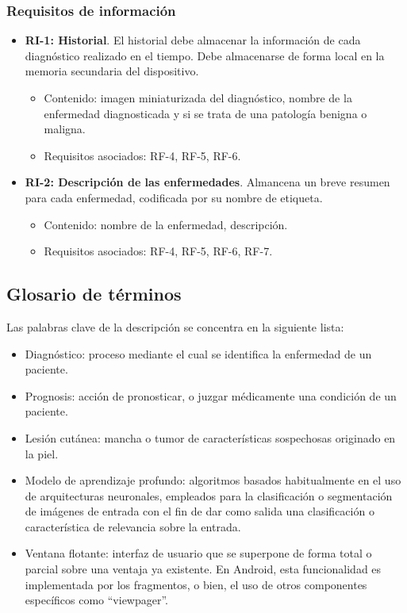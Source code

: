 \subsubsection{Requisitos de información}

\begin{itemize}
	 \item \textbf{RI-1: Historial}. El historial debe almacenar la información de cada diagnóstico realizado en el tiempo. Debe almacenarse de forma local en la memoria secundaria del dispositivo.
	 \begin{itemize}
	 	\item Contenido: imagen miniaturizada del diagnóstico, nombre de la enfermedad diagnosticada y si se trata de una patología benigna o maligna. 
	 	\item Requisitos asociados: RF-4, RF-5, RF-6.
	 \end{itemize}
	\item  \textbf{RI-2: Descripción de las enfermedades}. Almancena un breve resumen para cada enfermedad, codificada por su nombre de etiqueta.
		 \begin{itemize}
		\item Contenido: nombre de la enfermedad, descripción.
		\item Requisitos asociados: RF-4, RF-5, RF-6, RF-7.
	\end{itemize}
\end{itemize}

\subsection{Glosario de términos}
Las palabras clave de la descripción se concentra en la siguiente lista:
\begin{itemize}
	\item Diagnóstico: proceso mediante el cual se identifica la enfermedad de un paciente.
	\item Prognosis: acción de pronosticar, o juzgar médicamente una condición de un paciente.
	\item Lesión cutánea: mancha o tumor de características sospechosas originado en la piel.
	\item Modelo de aprendizaje profundo: algoritmos basados habitualmente en el uso de arquitecturas neuronales, empleados para la clasificación o segmentación de imágenes de entrada con el fin de dar como salida una clasificación o característica de relevancia sobre la entrada.
	\item Ventana flotante: interfaz de usuario que se superpone de forma total o parcial sobre una ventaja ya existente. En Android, esta funcionalidad es implementada por los fragmentos, o bien, el uso de otros componentes específicos como ``viewpager''.
\end{itemize}
	